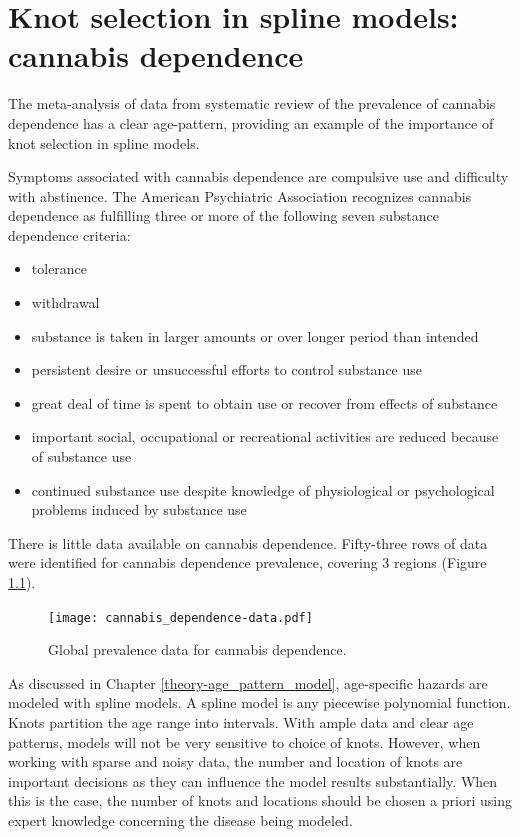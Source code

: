\chapter{Knot selection in spline models: cannabis dependence}
\label{applications-splines_knot_loc}

The meta-analysis of data from systematic review of the prevalence of cannabis dependence has a clear age-pattern, providing an example of the importance of knot selection in spline models.

Symptoms associated with cannabis dependence are compulsive use and difficulty with abstinence.  The American Psychiatric Association recognizes cannabis dependence as fulfilling three or more of the following seven substance dependence criteria:
    \begin{itemize} \label{tab:app-substance_dependence}
        \item tolerance
        \item withdrawal
        \item substance is taken in larger amounts or over longer period than intended
        \item persistent desire or unsuccessful efforts to control substance use
        \item great deal of time is spent to obtain use or recover from effects of substance
        \item important social, occupational or recreational activities are reduced because of substance use
        \item continued substance use despite knowledge of physiological or psychological problems induced by substance use \cite{american_diagnostic_2000, coffey_cannabis_2002}
    \end{itemize}

There is little data available on cannabis dependence.  Fifty-three rows of data were identified for cannabis dependence prevalence, covering 3 regions (Figure \ref{fig:app-cannabis_data}).

    \begin{figure}[h]
        \begin{center}
            \texttt{[image: cannabis\_dependence-data.pdf]}
            \caption{Global prevalence data for cannabis dependence.}
            \label{fig:app-cannabis_data}
        \end{center}
    \end{figure}

As discussed in Chapter \ref{theory-age_pattern_model}, age-specific hazards are modeled with spline models.  A spline model is any piecewise polynomial function.  Knots partition the age range into intervals.  With ample data and clear age patterns, models will not be very sensitive to choice of knots.  However, when working with sparse and noisy data, the number and location of knots are important decisions as they can influence the model results substantially.  When this is the case, the number of knots and locations should be chosen a priori using expert knowledge concerning the disease being modeled.

